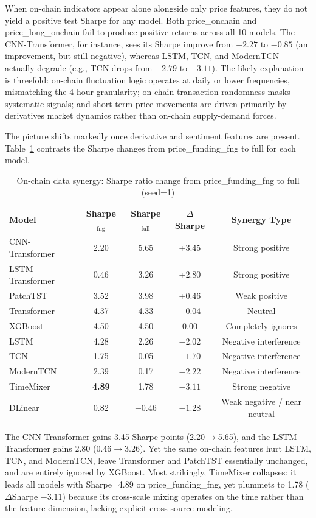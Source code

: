 \documentclass[a4paper]{cas-dc}
\begin{document}
When on-chain indicators appear alone alongside only price features, they do not yield a positive test Sharpe for any model. Both price\_onchain and price\_long\_onchain fail to produce positive returns across all 10 models. The CNN-Transformer, for instance, sees its Sharpe improve from $-2.27$ to $-0.85$ (an improvement, but still negative), whereas LSTM, TCN, and ModernTCN actually degrade (e.g., TCN drops from $-2.79$ to $-3.11$). The likely explanation is threefold: on-chain fluctuation logic operates at daily or lower frequencies, mismatching the 4-hour granularity; on-chain transaction randomness masks systematic signals; and short-term price movements are driven primarily by derivatives market dynamics rather than on-chain supply-demand forces.

The picture shifts markedly once derivative and sentiment features are present. Table~\ref{tab:onchain_synergy} contrasts the Sharpe changes from price\_funding\_fng to full for each model.

\begin{table}[t]
\centering
\caption{On-chain data synergy: Sharpe ratio change from price\_funding\_fng to full (seed=1)}
\label{tab:onchain_synergy}
\small
\begin{tabular}{lcccc}
\toprule
Model & Sharpe$_{\text{fng}}$ & Sharpe$_{\text{full}}$ & $\Delta$Sharpe & Synergy Type \\
\midrule
CNN-Transformer & 2.20 & 5.65 & +3.45 & Strong positive \\
LSTM-Transformer & 0.46 & 3.26 & +2.80 & Strong positive \\
PatchTST & 3.52 & 3.98 & +0.46 & Weak positive \\
Transformer & 4.37 & 4.33 & $-0.04$ & Neutral \\
XGBoost & 4.50 & 4.50 & 0.00 & Completely ignores \\
LSTM & 4.28 & 2.26 & $-2.02$ & Negative interference \\
TCN & 1.75 & 0.05 & $-1.70$ & Negative interference \\
ModernTCN & 2.39 & 0.17 & $-2.22$ & Negative interference \\
TimeMixer & \textbf{4.89} & 1.78 & \textbf{$-3.11$} & Strong negative \\
DLinear & 0.82 & $-0.46$ & $-1.28$ & Weak negative / near neutral \\
\bottomrule
\end{tabular}
\end{table}

The CNN-Transformer gains 3.45 Sharpe points (2.20$\to$5.65), and the LSTM-Transformer gains 2.80 (0.46$\to$3.26). Yet the same on-chain features hurt LSTM, TCN, and ModernTCN, leave Transformer and PatchTST essentially unchanged, and are entirely ignored by XGBoost. Most strikingly, TimeMixer collapses: it leads all models with Sharpe=4.89 on price\_funding\_fng, yet plummets to 1.78 ($\Delta$Sharpe $-3.11$) because its cross-scale mixing operates on the time rather than the feature dimension, lacking explicit cross-source modeling.
\end{document}
